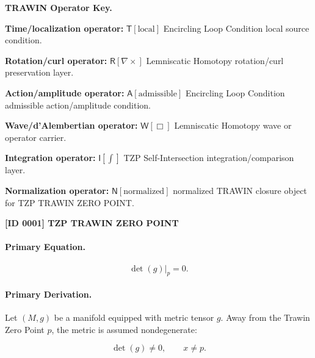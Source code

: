 \par\vspace{0.45\baselineskip}
\noindent\begin{minipage}[t]{\linewidth}
\begingroup
\small
\raggedright
\textbf{TRAWIN Operator Key.}\par
\noindent\textbf{Time/localization operator:} $\mathsf{T}\!\left[\mathrm{local}\right]$ Encircling Loop Condition local source condition.\par
\noindent\textbf{Rotation/curl operator:} $\mathsf{R}\!\left[\nabla\times\right]$ Lemniscatic Homotopy rotation/curl preservation layer.\par
\noindent\textbf{Action/amplitude operator:} $\mathsf{A}\!\left[\mathrm{admissible}\right]$ Encircling Loop Condition admissible action/amplitude condition.\par
\noindent\textbf{Wave/d'Alembertian operator:} $\mathsf{W}\!\left[\Box\right]$ Lemniscatic Homotopy wave or operator carrier.\par
\noindent\textbf{Integration operator:} $\mathsf{I}\!\left[\int\right]$ TZP Self-Intersection integration/comparison layer.\par
\noindent\textbf{Normalization operator:} $\mathsf{N}\!\left[\mathrm{normalized}\right]$ normalized TRAWIN closure object for TZP TRAWIN ZERO POINT.\par
\endgroup
\end{minipage}

\clearpage
\noindent\textbf{[ID 0001] TZP TRAWIN ZERO POINT}\par
\vspace{0.35em}
\paragraph{Primary Equation.}
\begin{equation}
\det(g)\big|_{p}=0 .
\end{equation}

\paragraph{Primary Derivation.}
Let $(M,g)$ be a manifold equipped with metric tensor $g$. Away from the Trawin Zero Point $p$, the metric is assumed nondegenerate:

\begin{equation}
\det(g)\neq 0,
\qquad x\neq p .
\end{equation}


